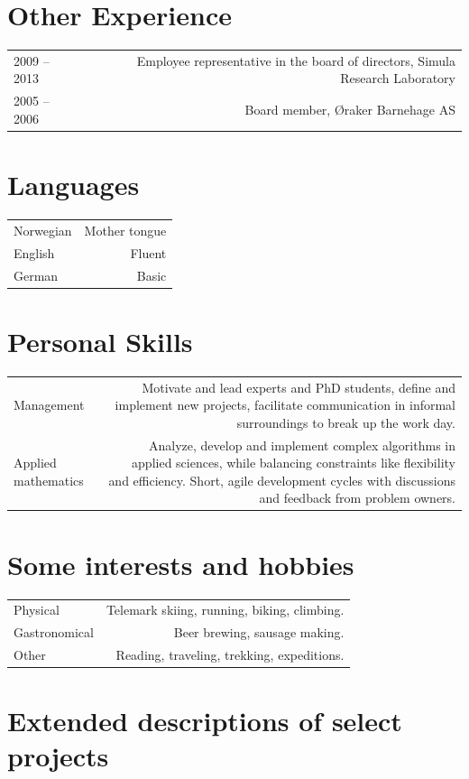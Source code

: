 \documentclass[english,a4paper,11pt]{article}
\begin{document}
\section*{Other Experience}
\begin{tabular}{LR}
2009 -- 2013& Employee representative in the board of directors, Simula Research Laboratory\\
2005 -- 2006& Board member, Øraker Barnehage AS\\
\end{tabular}

\section*{Languages}
\begin{tabular}{LR}
Norwegian & Mother tongue \\
English & Fluent \\
German & Basic \\
\end{tabular}

\section*{Personal Skills}
\begin{tabular}{LR}
Management & Motivate and lead experts and PhD students, define and implement new projects, facilitate communication in informal surroundings to break up the work day.\\
Applied mathematics & Analyze, develop and implement complex algorithms in applied sciences, while balancing constraints like flexibility and efficiency. Short, agile development cycles with discussions and feedback from problem owners.\\
\end{tabular}

\section*{Some interests and hobbies}
\begin{tabular}{LR}
Physical & Telemark skiing, running, biking, climbing.\\
Gastronomical & Beer brewing, sausage making.\\
Other & Reading, traveling, trekking, expeditions.\\
\end{tabular}

\section*{Extended descriptions of select projects}
\end{document}
